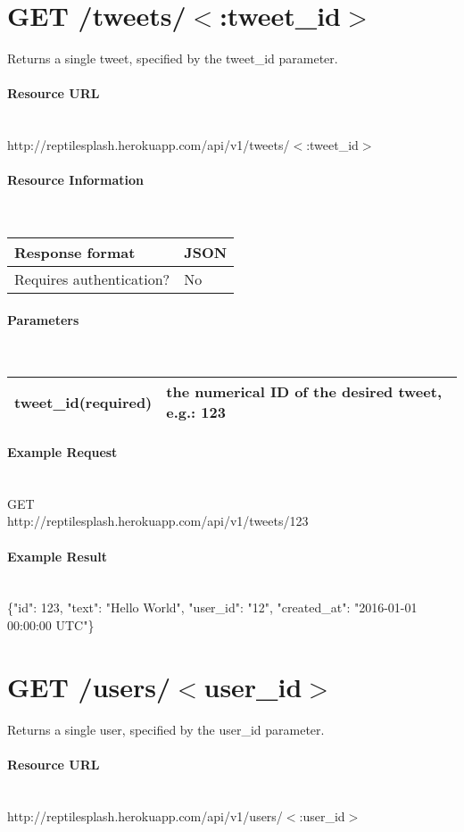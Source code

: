 \documentclass{article}
\begin{document}
	\section*{GET /tweets/$<$:tweet\_id$>$}
	Returns a single tweet, specified by the tweet\_id parameter. 
	\paragraph{Resource URL} \mbox{} \\
	http://reptilesplash.herokuapp.com/api/v1/tweets/$<$:tweet\_id$>$
	\paragraph{Resource Information} \mbox{} \\
	\begin{tabular}{ll}
		\hline
		Response format & JSON \\ \hline
		Requires authentication? & No \\ \hline
	\end{tabular}
	\paragraph{Parameters} \mbox{} \\
	\begin{tabular}{ll}
		\hline
		tweet\_id(required) & the numerical ID of the desired tweet, e.g.: 123\\ \hline
	\end{tabular}
	\paragraph{Example Request} \mbox{} \\
	GET \\
	http://reptilesplash.herokuapp.com/api/v1/tweets/123 
	\paragraph{Example Result} \mbox{} \\
	\{"id": 123, "text": "Hello World", "user\_id": "12", "created\_at": "2016-01-01 00:00:00 UTC"\}
	
	
	\section*{GET /users/$<$user\_id$>$}
	Returns a single user, specified by the user\_id parameter. 
	\paragraph{Resource URL} \mbox{} \\
	http://reptilesplash.herokuapp.com/api/v1/users/$<$:user\_id$>$
\end{document}
